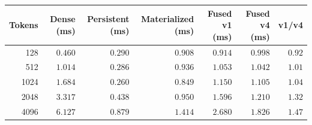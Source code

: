 \begin{tabular}{rrrrrrr}
\toprule
Tokens & Dense (ms) & Persistent (ms) & Materialized (ms) & Fused v1 (ms) & Fused v4 (ms) & v1/v4 \\
\midrule
128 & $0.460$ & $0.290$ & $0.908$ & $0.914$ & $0.998$ & $0.92$ \\
512 & $1.014$ & $0.286$ & $0.936$ & $1.053$ & $1.042$ & $1.01$ \\
1024 & $1.684$ & $0.260$ & $0.849$ & $1.150$ & $1.105$ & $1.04$ \\
2048 & $3.317$ & $0.438$ & $0.950$ & $1.596$ & $1.210$ & $1.32$ \\
4096 & $6.127$ & $0.879$ & $1.414$ & $2.680$ & $1.826$ & $1.47$ \\
\bottomrule
\end{tabular}
